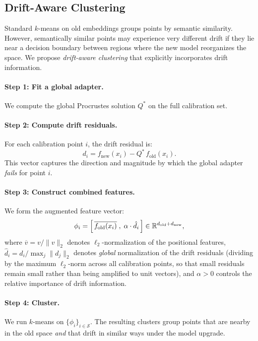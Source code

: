 \documentclass[11pt,a4paper]{article}
\newcommand{\fold}{f_{\mathrm{old}}}
\newcommand{\fnew}{f_{\mathrm{new}}}
\newcommand{\Rbb}{\mathbb{R}}
\begin{document}
\subsection{Drift-Aware Clustering}
\label{sec:method:driftaware}

Standard $k$-means on old embeddings groups points by semantic similarity.
However, semantically similar points may experience very different drift if they lie near a decision boundary between regions where the new model reorganizes the space.
We propose \emph{drift-aware clustering} that explicitly incorporates drift information.

\paragraph{Step 1: Fit a global adapter.}
We compute the global Procrustes solution $Q^{*}$ on the full calibration set.

\paragraph{Step 2: Compute drift residuals.}
For each calibration point $i$, the drift residual is:
\begin{equation}
  d_i = \fnew(x_i) - Q^{*}\, \fold(x_i).
  \label{eq:residual}
\end{equation}
This vector captures the direction and magnitude by which the global adapter \emph{fails} for point $i$.

\paragraph{Step 3: Construct combined features.}
We form the augmented feature vector:
\begin{equation}
  \phi_i = \Bigl[\,\overline{\fold(x_i)}\;,\; \alpha \cdot \hat{d}_i\,\Bigr] \in \Rbb^{d_{\mathrm{old}} + d_{\mathrm{new}}},
  \label{eq:combined}
\end{equation}
where $\overline{v} = v / \|v\|_2$ denotes $\ell_2$-normalization of the positional features, $\hat{d}_i = d_i / \max_j \|d_j\|_2$ denotes \emph{global} normalization of the drift residuals (dividing by the maximum $\ell_2$-norm across all calibration points, so that small residuals remain small rather than being amplified to unit vectors), and $\alpha > 0$ controls the relative importance of drift information.

\paragraph{Step 4: Cluster.}
We run $k$-means on $\{\phi_i\}_{i \in \mathcal{S}}$.
The resulting clusters group points that are nearby in the old space \emph{and} that drift in similar ways under the model upgrade.
\end{document}
